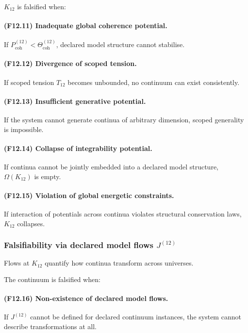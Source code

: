 $K_{12}$ is falsified when:

\paragraph{(F12.11) Inadequate global coherence potential.}
If $P_{\mathrm{coh}}^{(12)} < \Theta_{\mathrm{coh}}^{(12)}$,
declared model structure cannot stabilise.

\paragraph{(F12.12) Divergence of scoped tension.}
If scoped tension $T_{12}$ becomes unbounded,
no continuum can exist consistently.

\paragraph{(F12.13) Insufficient generative potential.}
If the system cannot generate continua of arbitrary dimension,
scoped generality is impossible.

\paragraph{(F12.14) Collapse of integrability potential.}
If continua cannot be jointly embedded into a declared model structure,
$\Omega(K_{12})$ is empty.

\paragraph{(F12.15) Violation of global energetic constraints.}
If interaction of potentials across continua violates structural
conservation laws, $K_{12}$ collapses.



\subsubsection{Falsifiability via declared model flows $J^{(12)}$}

Flows at $K_{12}$ quantify how continua transform across universes.

The continuum is falsified when:

\paragraph{(F12.16) Non-existence of declared model flows.}
If $J^{(12)}$ cannot be defined for declared continuum instances,
the system cannot describe transformations at all.

